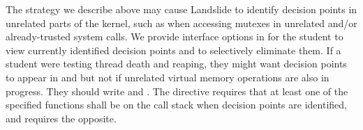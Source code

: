 The strategy we describe above may cause Landslide to identify decision points in unrelated parts of the kernel, such as when accessing mutexes in unrelated and/or already-trusted system calls.
We provide interface options in  for the student to view currently identified decision points and to selectively eliminate them.
If a student were testing thread death and reaping, they might want decision points to appear in  and  but not if unrelated virtual memory operations are also in progress.
They should write  and  .
The  directive requires that at least one of the specified functions shall be on the call stack when decision points are identified, and  requires the opposite.


%

